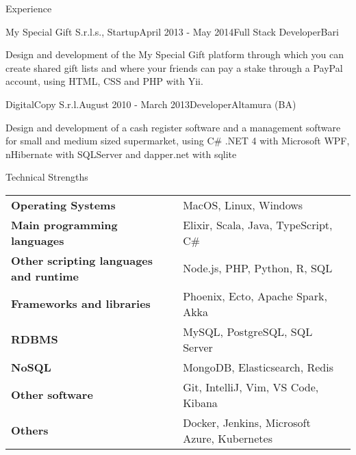 \documentclass{resume} %
\begin{document}
\begin{rSection}{Experience}

\begin{rSubsection}{My Special Gift S.r.l.s., Startup}{April 2013 - May 2014}{Full Stack Developer}{Bari}
\item Design and development of the My Special Gift platform through which you can create shared gift lists and where your friends can pay a stake through a PayPal account, using HTML, CSS and PHP with Yii.
\end{rSubsection}


\begin{rSubsection}{DigitalCopy S.r.l.}{August 2010 - March 2013}{Developer}{Altamura (BA)}
\item Design and development of a cash register software and a management software for small and medium sized supermarket, using C\# .NET 4 with Microsoft WPF, nHibernate with SQLServer and dapper.net with sqlite
\end{rSubsection}

\end{rSection}


\begin{rSection}{Technical Strengths}

\begin{tabular}{ @{} >{\bfseries}l @{\hspace{6ex}} l }
Operating Systems & MacOS, Linux, Windows \\
Main programming languages & Elixir, Scala, Java, TypeScript, C\# \\
Other scripting languages and runtime & Node.js, PHP, Python, R, SQL \\
Frameworks and libraries & Phoenix, Ecto, Apache Spark, Akka \\
RDBMS & MySQL, PostgreSQL, SQL Server \\
NoSQL & MongoDB, Elasticsearch, Redis \\
Other software & Git, IntelliJ, Vim, VS Code, Kibana \\
Others & Docker, Jenkins, Microsoft Azure, Kubernetes \\
\end{tabular}

\end{rSection}
\end{document}
